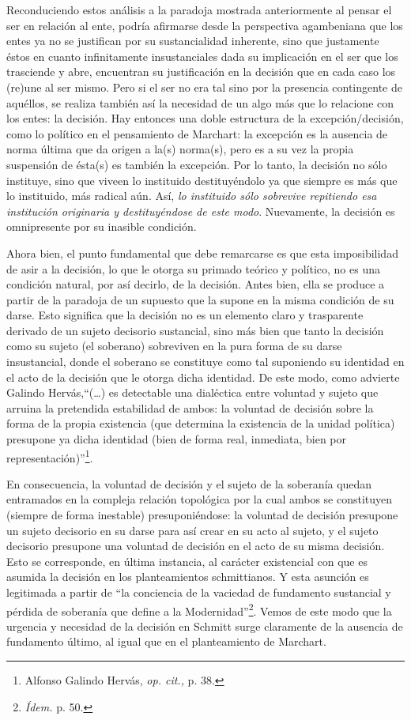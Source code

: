 Reconduciendo estos análisis a la paradoja mostrada anteriormente al pensar el ser en relación al ente, podría afirmarse desde la perspectiva agambeniana que los entes ya no se justifican por su sustancialidad inherente, sino que justamente éstos en cuanto infinitamente insustanciales dada su implicación en el ser que los trasciende y abre, encuentran su justificación en la decisión que en cada caso los (re)une al ser mismo. Pero si el ser no era tal sino por la presencia contingente de aquéllos, se realiza también así la necesidad de un algo más que lo relacione con los entes: la decisión. Hay entonces una doble estructura de la excepción/decisión, como lo político en el pensamiento de Marchart: la excepción es la ausencia de norma última que da origen a la(s) norma(s), pero es a su vez la propia suspensión de ésta(s) es también la excepción. Por lo tanto, la decisión no sólo instituye, sino que viveen lo instituido destituyéndolo ya que siempre es más que lo instituido, más radical aún. Así, \emph{lo instituido sólo sobrevive repitiendo esa institución originaria y destituyéndose de este modo}. Nuevamente, la decisión es omnipresente por su inasible condición.

Ahora bien, el punto fundamental que debe remarcarse es que esta imposibilidad de asir a la decisión, lo que le otorga su primado teórico y político, no es una condición natural, por así decirlo, de la decisión. Antes bien, ella se produce a partir de la paradoja de un supuesto que la supone en la misma condición de su darse. Esto significa que la decisión no es un elemento claro y trasparente derivado de un sujeto decisorio sustancial, sino más bien que tanto la decisión como su sujeto (el soberano) sobreviven en la pura forma de su darse insustancial, donde el soberano se constituye como tal suponiendo su identidad en el acto de la decisión que le otorga dicha identidad. De este modo, como advierte Galindo Hervás,\enquote{(\dots) es detectable una dialéctica entre voluntad y sujeto que arruina la pretendida estabilidad de ambos: la voluntad de decisión sobre la forma de la propia existencia (que determina la existencia de la unidad política) presupone ya dicha identidad (bien de forma real, inmediata, bien por representación)}\footnote{Alfonso Galindo Hervás, \emph{op. cit.,} p. 38.}.

En consecuencia, la voluntad de decisión y el sujeto de la soberanía quedan entramados en la compleja relación topológica por la cual ambos se constituyen (siempre de forma inestable) presuponiéndose: la voluntad de decisión presupone un sujeto decisorio en su darse para así crear en su acto al sujeto, y el sujeto decisorio presupone una voluntad de decisión en el acto de su misma decisión. Esto se corresponde, en última instancia, al carácter existencial con que es asumida la decisión en los planteamientos schmittianos. Y esta asunción es legitimada a partir de \enquote{la conciencia de la vaciedad de fundamento sustancial y pérdida de soberanía que define a la Modernidad}\footnote{\emph{Ídem.} p. 50.}. Vemos de este modo que la urgencia y necesidad de la decisión en Schmitt surge claramente de la ausencia de fundamento último, al igual que en el planteamiento de Marchart.

